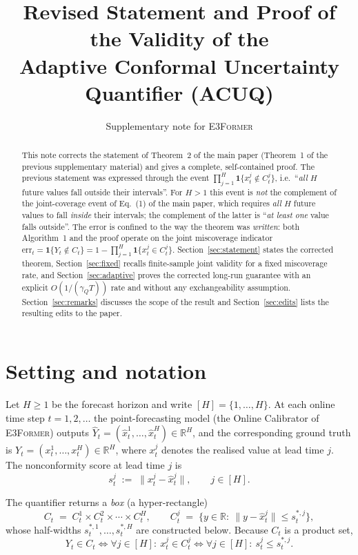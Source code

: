 \documentclass[11pt]{article}
\title{Revised Statement and Proof of the Validity of the\\
Adaptive Conformal Uncertainty Quantifier (ACUQ)}
\author{Supplementary note for \textsc{E3Former}}
\date{}
\theoremstyle{definition}
\theoremstyle{remark}
\newcommand{\R}{\mathbb{R}}
\newcommand{\ind}{\mathbf{1}}
\newcommand{\err}{\mathrm{err}}
\newcommand{\horizon}{[H]}
\begin{document}
\maketitle

\begin{abstract}
This note corrects the statement of Theorem~2 of the main paper (Theorem~1 of the
previous supplementary material) and gives a complete, self-contained proof.
The previous statement was expressed through the event
$\prod_{j=1}^{H}\ind\{x_t^{j}\notin C_t^{j}\}$, i.e.\ ``\emph{all} $H$ future
values fall outside their intervals''. For $H>1$ this event is \emph{not} the
complement of the joint-coverage event of Eq.~(1) of the main paper, which
requires \emph{all} $H$ future values to fall \emph{inside} their intervals; the
complement of the latter is ``\emph{at least one} value falls outside''. The
error is confined to the way the theorem was \emph{written}: both
Algorithm~1 and the proof operate on the joint miscoverage indicator
$\err_t=\ind\{Y_t\notin C_t\}=1-\prod_{j=1}^{H}\ind\{x_t^{j}\in C_t^{j}\}$.
Section~\ref{sec:statement} states the corrected theorem, Section~\ref{sec:fixed}
recalls finite-sample joint validity for a fixed miscoverage rate, and
Section~\ref{sec:adaptive} proves the corrected long-run guarantee with an
explicit $O(1/(\gamma_Q T))$ rate and without any exchangeability assumption.
Section~\ref{sec:remarks} discusses the scope of the result and
Section~\ref{sec:edits} lists the resulting edits to the paper.
\end{abstract}

\section{Setting and notation}
\label{sec:setting}

Let $H\ge 1$ be the forecast horizon and write $\horizon=\{1,\dots,H\}$. At each
online time step $t=1,2,\dots$ the point-forecasting model (the Online
Calibrator of \textsc{E3Former}) outputs
$\widehat{Y}_t=(\hat{x}_t^{1},\dots,\hat{x}_t^{H})\in\R^{H}$, and the
corresponding ground truth is $Y_t=(x_t^{1},\dots,x_t^{H})\in\R^{H}$, where
$x_t^{j}$ denotes the realised value at lead time $j$. The nonconformity score
at lead time $j$ is
\begin{equation}
  s_t^{j}\;:=\;\bigl\lVert x_t^{j}-\hat{x}_t^{j}\bigr\rVert ,
  \qquad j\in\horizon .
  \label{eq:score}
\end{equation}

The quantifier returns a \emph{box} (a hyper-rectangle)
\begin{equation}
  C_t\;=\;C_t^{1}\times C_t^{2}\times\cdots\times C_t^{H},
  \qquad
  C_t^{j}\;=\;\bigl\{y\in\R:\ \lVert y-\hat{x}_t^{j}\rVert\le s_t^{*,j}\bigr\},
  \label{eq:box}
\end{equation}
whose half-widths $s_t^{*,1},\dots,s_t^{*,H}$ are constructed below. Because
$C_t$ is a product set,
\begin{equation}
  Y_t\in C_t
  \iff
  \forall j\in\horizon:\ x_t^{j}\in C_t^{j}
  \iff
  \forall j\in\horizon:\ s_t^{j}\le s_t^{*,j}.
  \label{eq:boxequiv}
\end{equation}
\end{document}
